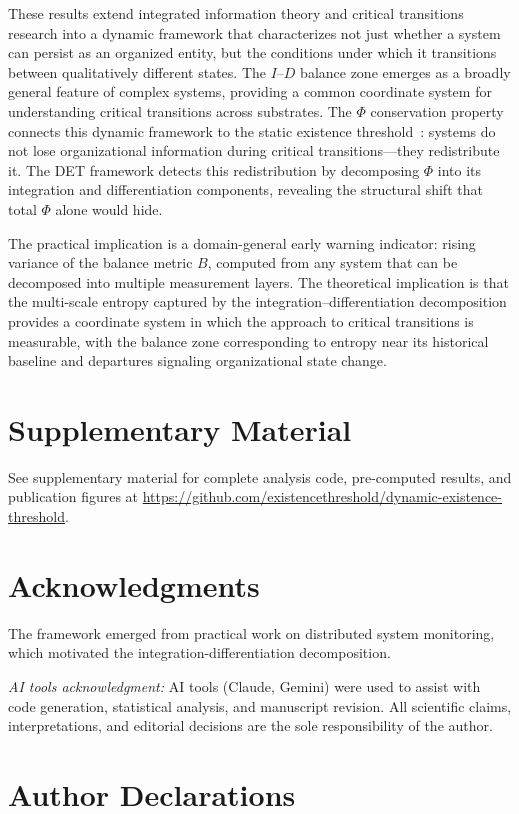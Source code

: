 \documentclass[12pt,a4paper]{article}
\begin{document}
These results extend integrated information theory and critical transitions research into a dynamic framework that characterizes not just whether a system can persist as an organized entity, but the conditions under which it transitions between qualitatively different states. The $I$--$D$ balance zone emerges as a broadly general feature of complex systems, providing a common coordinate system for understanding critical transitions across substrates. The $\Phi$ conservation property connects this dynamic framework to the static existence threshold~\cite{thornhill2026a}: systems do not lose organizational information during critical transitions---they redistribute it. The DET framework detects this redistribution by decomposing $\Phi$ into its integration and differentiation components, revealing the structural shift that total $\Phi$ alone would hide.

The practical implication is a domain-general early warning indicator: rising variance of the balance metric $B$, computed from any system that can be decomposed into multiple measurement layers. The theoretical implication is that the multi-scale entropy captured by the integration--differentiation decomposition provides a coordinate system in which the approach to critical transitions is measurable, with the balance zone corresponding to entropy near its historical baseline and departures signaling organizational state change.


\section*{Supplementary Material}

See supplementary material for complete analysis code, pre-computed results, and publication figures at \url{https://github.com/existencethreshold/dynamic-existence-threshold}.

\section*{Acknowledgments}
The framework emerged from practical work on distributed system monitoring, which motivated the integration-differentiation decomposition.

\emph{AI tools acknowledgment:} AI tools (Claude, Gemini) were used to assist with code generation, statistical analysis, and manuscript revision. All scientific claims, interpretations, and editorial decisions are the sole responsibility of the author.

\section*{Author Declarations}
\end{document}
